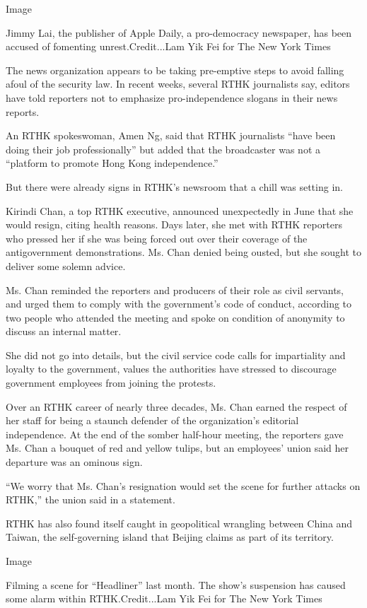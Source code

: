Image

Jimmy Lai, the publisher of Apple Daily, a pro-democracy newspaper, has
been accused of fomenting unrest.Credit...Lam Yik Fei for The New York
Times

The news organization appears to be taking pre-emptive steps to avoid
falling afoul of the security law. In recent weeks, several RTHK
journalists say, editors have told reporters not to emphasize
pro-independence slogans in their news reports.

An RTHK spokeswoman, Amen Ng, said that RTHK journalists ``have been
doing their job professionally'' but added that the broadcaster was not
a ``platform to promote Hong Kong independence.''

But there were already signs in RTHK's newsroom that a chill was setting
in.

Kirindi Chan, a top RTHK executive, announced unexpectedly in June that
she would resign, citing health reasons. Days later, she met with RTHK
reporters who pressed her if she was being forced out over their
coverage of the antigovernment demonstrations. Ms. Chan denied being
ousted, but she sought to deliver some solemn advice.

Ms. Chan reminded the reporters and producers of their role as civil
servants, and urged them to comply with the government's code of
conduct, according to two people who attended the meeting and spoke on
condition of anonymity to discuss an internal matter.

She did not go into details, but the civil service code calls for
impartiality and loyalty to the government, values the authorities have
stressed to discourage government employees from joining the protests.

Over an RTHK career of nearly three decades, Ms. Chan earned the respect
of her staff for being a staunch defender of the organization's
editorial independence. At the end of the somber half-hour meeting, the
reporters gave Ms. Chan a bouquet of red and yellow tulips, but an
employees' union said her departure was an ominous sign.

``We worry that Ms. Chan's resignation would set the scene for further
attacks on RTHK,'' the union said in a statement.

RTHK has also found itself caught in geopolitical wrangling between
China and Taiwan, the self-governing island that Beijing claims as part
of its territory.

Image

Filming a scene for ``Headliner'' last month. The show's suspension has
caused some alarm within RTHK.Credit...Lam Yik Fei for The New York
Times

